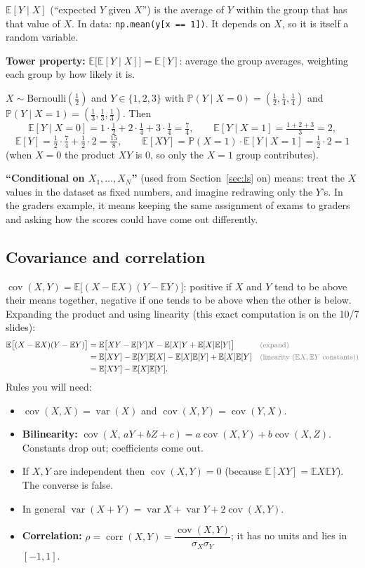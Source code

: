 \documentclass[11pt]{article}
\newcommand{\E}{\mathbb{E}}
\newcommand{\Var}{\operatorname{var}}
\newcommand{\Cov}{\operatorname{cov}}
\newcommand{\corr}{\operatorname{corr}}
\renewcommand{\P}{\mathbb{P}}
\newcommand{\given}{\mid}
\newcommand{\Bern}{\text{Bernoulli}}
\newcommand{\py}[1]{\texttt{#1}}
\newcommand{\why}[1]{&&\text{\small\color{gray}(#1)}}
\begin{document}
\textbf{$\E[Y\given X]$} (``expected $Y$ given $X$'') is the average of $Y$ within the group that has that value of $X$. In data:
\py{np.mean(y[x == 1])}. It depends on $X$, so it is itself a random variable.

\textbf{Tower property:} $\E\big[\E[Y\given X]\big]=\E[Y]$: average the group averages, weighting each group by how likely it is.

\begin{examplebox}[title={Example (Lecture 5): the tower property}]
$X\sim\Bern(\tfrac12)$ and $Y\in\{1,2,3\}$ with $\P(Y\given X{=}0)=(\tfrac12,\tfrac14,\tfrac14)$ and $\P(Y\given X{=}1)=(\tfrac13,\tfrac13,\tfrac13)$. Then
\[
\E[Y\given X{=}0]=1\cdot\tfrac12+2\cdot\tfrac14+3\cdot\tfrac14=\tfrac74,\qquad \E[Y\given X{=}1]=\tfrac{1+2+3}{3}=2,
\]
\[
\E[Y]=\tfrac12\cdot\tfrac74+\tfrac12\cdot2=\tfrac{15}{8},\qquad
\E[XY]=\P(X{=}1)\cdot\E[Y\given X{=}1]=\tfrac12\cdot2=1
\]
(when $X=0$ the product $XY$ is $0$, so only the $X=1$ group contributes).
\end{examplebox}

\textbf{``Conditional on $X_1,\dots,X_N$''} (used from Section~\ref{sec:ls} on) means: treat the $X$ values in the dataset as fixed
numbers, and imagine redrawing only the $Y$'s. In the graders example, it means keeping the same assignment of exams to graders and asking
how the scores could have come out differently.

\subsection{Covariance and correlation}
$\Cov(X,Y)=\E\big[(X-\E X)(Y-\E Y)\big]$: positive if $X$ and $Y$ tend to be above their means together, negative if one tends to be above
when the other is below. Expanding the product and using linearity (this exact computation is on the 10/7 slides):
\begin{align*}
\E\big[(X-\E X)(Y-\E Y)\big]&=\E\big[XY-\E[Y]X-\E[X]Y+\E[X]\E[Y]\big] \why{expand}\\
&=\E[XY]-\E[Y]\E[X]-\E[X]\E[Y]+\E[X]\E[Y] \why{linearity ($\E X,\E Y$ constants)}\\
&=\E[XY]-\E[X]\E[Y].
\end{align*}
Rules you will need:
\begin{itemize}[leftmargin=*,itemsep=2pt]
\item $\Cov(X,X)=\Var(X)$ and $\Cov(X,Y)=\Cov(Y,X)$.
\item \textbf{Bilinearity:} $\Cov(X,\,aY+bZ+c)=a\Cov(X,Y)+b\Cov(X,Z)$. Constants drop out; coefficients come out.
\item If $X,Y$ are independent then $\Cov(X,Y)=0$ (because $\E[XY]=\E X\E Y$). The converse is false.
\item In general $\Var(X+Y)=\Var X+\Var Y+2\Cov(X,Y)$.
\item \textbf{Correlation:} $\rho=\corr(X,Y)=\dfrac{\Cov(X,Y)}{\sigma_X\sigma_Y}$; it has no units and lies in $[-1,1]$.
\end{itemize}
\end{document}
